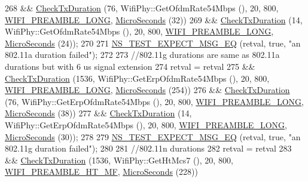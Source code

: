 \begin{DoxyCode}
268     && \hyperlink{classTxDurationTest_ac86b852957ecf1a1bed4f4e48debb30e}{CheckTxDuration} (76, WifiPhy::GetOfdmRate54Mbps (), 20, 800, 
      \hyperlink{group__wifi_gga5e94a56cb338a14ffbbb19c6a41251eba12f3d9468d1630bd38bbef20df1e3eda}{WIFI\_PREAMBLE\_LONG}, \hyperlink{group__timecivil_ga17465a639c8d1464e76538afdd78a9f0}{MicroSeconds} (32))
269     && \hyperlink{classTxDurationTest_ac86b852957ecf1a1bed4f4e48debb30e}{CheckTxDuration} (14, WifiPhy::GetOfdmRate54Mbps (), 20, 800, 
      \hyperlink{group__wifi_gga5e94a56cb338a14ffbbb19c6a41251eba12f3d9468d1630bd38bbef20df1e3eda}{WIFI\_PREAMBLE\_LONG}, \hyperlink{group__timecivil_ga17465a639c8d1464e76538afdd78a9f0}{MicroSeconds} (24));
270 
271   \hyperlink{group__testing_ga7304ba46a28d8cf08dfdfd6499cf7068}{NS\_TEST\_EXPECT\_MSG\_EQ} (retval, \textcolor{keyword}{true}, \textcolor{stringliteral}{"an 802.11a duration failed"});
272 
273   \textcolor{comment}{//802.11g durations are same as 802.11a durations but with 6 us signal extension}
274   retval = retval
275     && \hyperlink{classTxDurationTest_ac86b852957ecf1a1bed4f4e48debb30e}{CheckTxDuration} (1536, WifiPhy::GetErpOfdmRate54Mbps (), 20, 800, 
      \hyperlink{group__wifi_gga5e94a56cb338a14ffbbb19c6a41251eba12f3d9468d1630bd38bbef20df1e3eda}{WIFI\_PREAMBLE\_LONG}, \hyperlink{group__timecivil_ga17465a639c8d1464e76538afdd78a9f0}{MicroSeconds} (254))
276     && \hyperlink{classTxDurationTest_ac86b852957ecf1a1bed4f4e48debb30e}{CheckTxDuration} (76, WifiPhy::GetErpOfdmRate54Mbps (), 20, 800, 
      \hyperlink{group__wifi_gga5e94a56cb338a14ffbbb19c6a41251eba12f3d9468d1630bd38bbef20df1e3eda}{WIFI\_PREAMBLE\_LONG}, \hyperlink{group__timecivil_ga17465a639c8d1464e76538afdd78a9f0}{MicroSeconds} (38))
277     && \hyperlink{classTxDurationTest_ac86b852957ecf1a1bed4f4e48debb30e}{CheckTxDuration} (14, WifiPhy::GetErpOfdmRate54Mbps (), 20, 800, 
      \hyperlink{group__wifi_gga5e94a56cb338a14ffbbb19c6a41251eba12f3d9468d1630bd38bbef20df1e3eda}{WIFI\_PREAMBLE\_LONG}, \hyperlink{group__timecivil_ga17465a639c8d1464e76538afdd78a9f0}{MicroSeconds} (30));
278 
279   \hyperlink{group__testing_ga7304ba46a28d8cf08dfdfd6499cf7068}{NS\_TEST\_EXPECT\_MSG\_EQ} (retval, \textcolor{keyword}{true}, \textcolor{stringliteral}{"an 802.11g duration failed"});
280 
281   \textcolor{comment}{//802.11n durations}
282   retval = retval
283     && \hyperlink{classTxDurationTest_ac86b852957ecf1a1bed4f4e48debb30e}{CheckTxDuration} (1536, WifiPhy::GetHtMcs7 (), 20, 800, 
      \hyperlink{group__wifi_gga5e94a56cb338a14ffbbb19c6a41251ebae0944a664debb28943c12d4cd7a81d2a}{WIFI\_PREAMBLE\_HT\_MF}, \hyperlink{group__timecivil_ga17465a639c8d1464e76538afdd78a9f0}{MicroSeconds} (228))

\end{DoxyCode}
